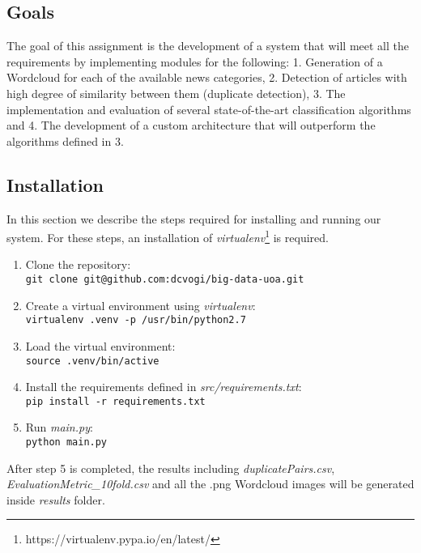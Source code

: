 \subsection{Goals}
The goal of this assignment is the development of a system that will meet all the requirements by implementing modules for the following: 1. Generation of a Wordcloud for each of the available news categories, 2. Detection of articles with high degree of similarity between them (duplicate detection), 3. The implementation and evaluation of several state-of-the-art classification algorithms and 4. The development of a custom architecture that will outperform the algorithms defined in 3.
\subsection{Installation}
In this section we describe the steps required for installing and running our system. For these steps, an installation of \emph{virtualenv}\footnote{https://virtualenv.pypa.io/en/latest/} is required.
\begin{enumerate}
	\item Clone the repository:\\
	\texttt{git clone git@github.com:dcvogi/big-data-uoa.git}
	\item Create a virtual environment using \emph{virtualenv}:\\
	\texttt{virtualenv .venv -p /usr/bin/python2.7}
	\item Load the virtual environment:\\ 
	\texttt{source .venv/bin/active}
	\item Install the requirements defined in \emph{src/requirements.txt}:\\
	\texttt{pip install -r requirements.txt}
	\item Run \emph{main.py}:\\
	\texttt{python main.py}
\end{enumerate}
After step 5 is completed, the results including \emph{duplicatePairs.csv}, \emph{EvaluationMetric\_10fold.csv} and all the .png Wordcloud images will be generated inside \emph{results} folder.